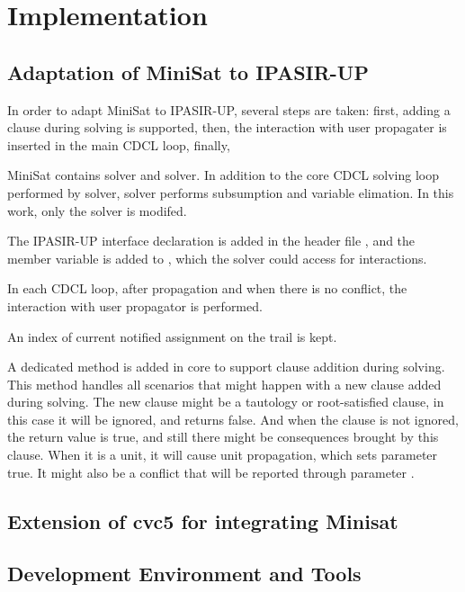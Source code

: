 \chapter{Implementation}

\section{Adaptation of MiniSat to IPASIR-UP}

In order to adapt MiniSat to IPASIR-UP, several steps are taken: first, adding a clause during solving is supported, then, the interaction with user propagater is inserted in the main CDCL loop, finally, 

MiniSat contains  solver and  solver. In addition to the core CDCL solving loop performed by  solver,  solver performs subsumption and variable elimation. In this work, only the  solver is modifed.

The IPASIR-UP interface  declaration is added in the header file , and the  member variable is added to , which the solver could access for interactions.

In each CDCL loop, after propagation and when there is no conflict, the interaction with user propagator is performed.

An index of current notified assignment on the trail is kept.


A dedicated method  is added in core  to support clause addition during solving. This method handles all scenarios that might happen with a new clause added during solving. The new clause might be a tautology or root-satisfied clause, in this case it will be ignored, and  returns false. And when the clause is not ignored, the return value is true, and still there might be consequences brought by this clause. When it is a unit, it will cause unit propagation, which sets parameter  true. It might also be a conflict that will be reported through parameter .




\section{Extension of cvc5 for integrating Minisat}


%

\section{Development Environment and Tools}



